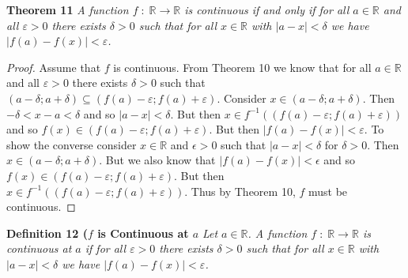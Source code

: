 \documentclass{article}
\begin{document}
\begin{flushleft}
\textbf{Theorem 11}
\textsl{A function $f \; : \; \mathbb{R} \rightarrow \mathbb{R}$ is continuous if and only if for all $a \in \mathbb{R}$ and all $\varepsilon > 0$ there exists $\delta > 0$ such that for all $x \in \mathbb{R}$ with $|a-x| < \delta$ we have $|f(a)-f(x)| < \varepsilon$.}
\begin{proof}
Assume that $f$ is continuous. From Theorem 10 we know that for all $a \in \mathbb{R}$ and all $\varepsilon > 0$ there exists $\delta > 0$ such that $(a - \delta ; a + \delta) \subseteq (f(a) - \varepsilon ; f(a) + \varepsilon)$. Consider $x \in (a - \delta ; a + \delta)$. Then $- \delta < x-a < \delta$ and so $|a-x| < \delta$. But then $x \in f^{-1}((f(a) - \varepsilon ; f(a) + \varepsilon))$ and so $f(x) \in (f(a) - \varepsilon ; f(a) + \varepsilon)$. But then $|f(a) - f(x)| < \varepsilon$. To show the converse consider $x \in \mathbb{R}$ and $\epsilon > 0$ such that $|a-x| < \delta$ for $\delta > 0$. Then $x \in (a - \delta ; a + \delta)$. But we also know that $|f(a) - f(x)| < \epsilon$ and so $f(x) \in (f(a) - \varepsilon ; f(a) + \varepsilon)$. But then $x \in f^{-1}((f(a) - \varepsilon ; f(a) + \varepsilon))$. Thus by Theorem 10, $f$ must be continuous.
\end{proof}

\textbf{Definition 12 ($f$ is Continuous at $a$}
\textsl{Let $a \in \mathbb{R}$. A function $f \; : \; \mathbb{R} \rightarrow \mathbb{R}$ is continuous at $a$ if for all $\varepsilon > 0$ there exists $\delta > 0$ such that for all $x \in \mathbb{R}$ with $|a-x| < \delta$ we have $|f(a)-f(x)| < \varepsilon$.}

\end{flushleft}
\end{document}
